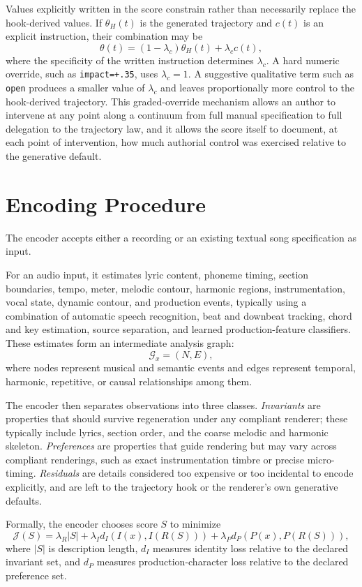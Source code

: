 \documentclass[11pt]{article}
\begin{document}
Values explicitly written in the score constrain rather than necessarily replace the hook-derived values. If $\theta_H(t)$ is the generated trajectory and $c(t)$ is an explicit instruction, their combination may be
\[
\theta(t)
=
(1-\lambda_c)\theta_H(t)
+
\lambda_c c(t),
\]
where the specificity of the written instruction determines $\lambda_c$. A hard numeric override, such as \texttt{impact=+.35}, uses $\lambda_c=1$. A suggestive qualitative term such as \texttt{open} produces a smaller value of $\lambda_c$ and leaves proportionally more control to the hook-derived trajectory. This graded-override mechanism allows an author to intervene at any point along a continuum from full manual specification to full delegation to the trajectory law, and it allows the score itself to document, at each point of intervention, how much authorial control was exercised relative to the generative default.

\section{Encoding Procedure}

The encoder accepts either a recording or an existing textual song specification as input.

For an audio input, it estimates lyric content, phoneme timing, section boundaries, tempo, meter, melodic contour, harmonic regions, instrumentation, vocal state, dynamic contour, and production events, typically using a combination of automatic speech recognition, beat and downbeat tracking, chord and key estimation, source separation, and learned production-feature classifiers. These estimates form an intermediate analysis graph:
\[
\mathcal{G}_x=(N,E),
\]
where nodes represent musical and semantic events and edges represent temporal, harmonic, repetitive, or causal relationships among them.

The encoder then separates observations into three classes. \emph{Invariants} are properties that should survive regeneration under any compliant renderer; these typically include lyrics, section order, and the coarse melodic and harmonic skeleton. \emph{Preferences} are properties that guide rendering but may vary across compliant renderings, such as exact instrumentation timbre or precise micro-timing. \emph{Residuals} are details considered too expensive or too incidental to encode explicitly, and are left to the trajectory hook or the renderer's own generative defaults.

Formally, the encoder chooses score $S$ to minimize
\[
\mathcal{J}(S)
=
\lambda_R |S|
+
\lambda_I d_I\!\left(I(x),I(R(S))\right)
+
\lambda_P d_P\!\left(P(x),P(R(S))\right),
\]
where $|S|$ is description length, $d_I$ measures identity loss relative to the declared invariant set, and $d_P$ measures production-character loss relative to the declared preference set.
\end{document}
